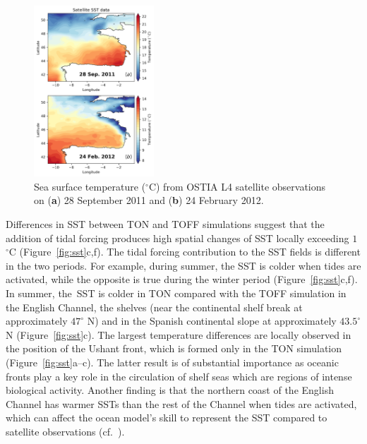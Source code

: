 \documentclass[jmse,article,accept,moreauthors,pdftex]{Definitions/mdpi}
\begin{document}
\begin{figure}[H]
    \centering
    \includegraphics[width=0.4\textwidth]{Definitions/figure3.png}
    \caption{Sea surface temperature ($^\circ$C) from OSTIA L4 satellite observations on (\textbf{a}) 28 September 2011 and (\textbf{b}) 24 February 2012.}
    \label{fig:ostia}
\end{figure}
 
Differences in SST between TON and TOFF simulations suggest that the addition of tidal forcing produces high spatial changes of SST locally exceeding $1$ $^\circ$C (Figure~\ref{fig:sst}c,f). The tidal forcing contribution to the SST fields is different in the two periods. For example, during summer, the SST is colder when tides are activated, while the opposite is true during the winter period (Figure~\ref{fig:sst}c,f). In summer, the~SST is colder in TON compared with the TOFF simulation in the English Channel, the shelves (near the continental shelf break at approximately $47 ^\circ$ N) and in the Spanish continental slope at approximately $43.5 ^\circ$ N (Figure~\ref{fig:sst}c). The largest temperature differences are locally observed in the position of the Ushant front, which is formed only in the TON simulation (Figure~\ref{fig:sst}a--c). The latter result is of substantial importance as oceanic fronts play a key role in the circulation of shelf seas which are regions of intense biological activity. Another finding is that the northern coast of the English Channel has warmer SSTs than the rest of the Channel when tides are activated, which can affect the ocean model's skill to represent the SST compared to satellite observations (cf.~\cite{TIMKO2019}).
\end{document}
